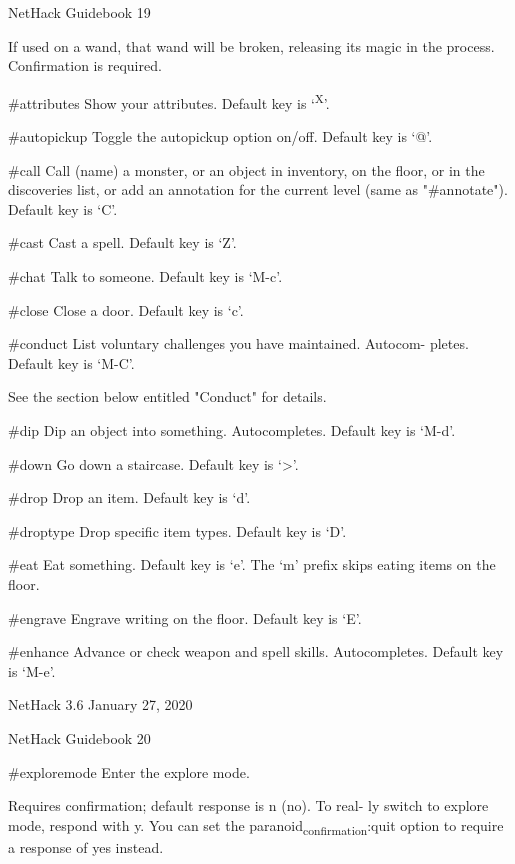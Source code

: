 \documentclass[11pt]{article}
\begin{document}
NetHack Guidebook                       19



If used on a wand, that wand will be broken, releasing its
magic in the process. Confirmation is required.

\#attributes
   Show your attributes. Default key is `\textsuperscript{X}'.

\#autopickup
   Toggle the autopickup option on/off. Default key is `@'.

\#call
   Call (name) a monster, or an object in inventory, on the
   floor, or in the discoveries list, or add an annotation for
   the current level (same as "\#annotate"). Default key is
   `C'.

\#cast
   Cast a spell. Default key is `Z'.

\#chat
   Talk to someone. Default key is `M-c'.

\#close
   Close a door. Default key is `c'.

\#conduct
   List voluntary challenges you have maintained.  Autocom-
   pletes. Default key is `M-C'.

See the section below entitled "Conduct" for details.

\#dip
   Dip an object into something. Autocompletes. Default key
   is `M-d'.

\#down
   Go down a staircase. Default key is `>'.

\#drop
   Drop an item. Default key is `d'.

\#droptype
   Drop specific item types. Default key is `D'.

\#eat
   Eat something. Default key is `e'. The `m' prefix skips
   eating items on the floor.

\#engrave
   Engrave writing on the floor. Default key is `E'.

\#enhance
   Advance or check weapon and spell skills. Autocompletes.
   Default key is `M-e'.



NetHack 3.6                   January 27, 2020





NetHack Guidebook                       20



\#exploremode
   Enter the explore mode.

Requires confirmation; default response is n (no). To real-
ly switch to explore mode, respond with y. You can set the
paranoid\textsubscript{confirmation}:quit option to require a response of
yes instead.
\end{document}
